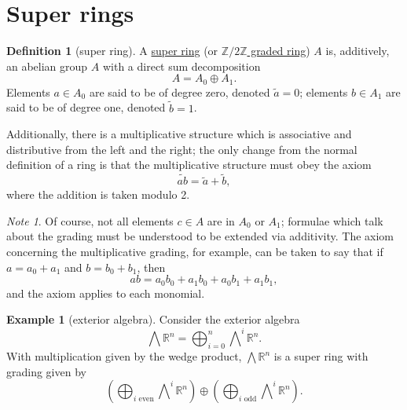 \documentclass[a4paper]{report}
\newcommand{\R}{\mathbb{R}}
\newcommand{\Z}{\mathbb{Z}}
\newcommand{\defn}[1]{\ul{#1}}
\theoremstyle{definition}
\newtheorem{definition}{Definition}[section]
\newtheorem{example}{Example}[section]
\theoremstyle{plain}
\theoremstyle{remark}
\newtheorem{note}{Note}[section]
\begin{document}
\section{Super rings}
\begin{definition}[super ring]
  \label{def:superring}
  A \defn{super ring} (or \defn{$\Z/2\Z$ graded ring}) $A$ is, additively, an abelian group $A$ with a direct sum decomposition
  \begin{equation*}
    A = A_{0} \oplus A_{1}.
  \end{equation*}
  Elements $a\in A_{0}$ are said to be of degree zero, denoted $\tilde{a} = 0$; elements $b\in A_{1}$ are said to be of degree one, denoted $\tilde{b} = 1$.

  Additionally, there is a multiplicative structure which is associative and distributive from the left and the right; the only change from the normal definition of a ring is that the multiplicative structure must obey the axiom
  \begin{equation*}
    \widetilde{ab} = \tilde{a} + \tilde{b},
  \end{equation*}
  where the addition is taken modulo 2.
\end{definition}

\begin{note}
  Of course, not all elements $c \in A$ are in $A_{0}$ or $A_{1}$; formulae which talk about the grading must be understood to be extended via additivity. The axiom concerning the multiplicative grading, for example, can be taken to say that if $a = a_{0} + a_{1}$ and $b = b_{0} + b_{1}$, then
  \begin{equation*}
    ab = a_{0} b_{0} + a_{1} b_{0} + a_{0} b_{1} + a_{1} b_{1},
  \end{equation*}
  and the axiom applies to each monomial.
\end{note}

\begin{example}[exterior algebra]
  \label{eg:exterioralgebra}
  Consider the exterior algebra
  \begin{equation*}
    \bigwedge \R^{n} = \bigoplus_{i=0}^{n} \bigwedge\nolimits^{i} \R^{n}.
  \end{equation*}
  With multiplication given by the wedge product, $\bigwedge \R^{n}$ is a super ring with grading given by
  \begin{equation*}
    \left( \bigoplus_{i\text{ even}} \bigwedge\nolimits^{i}\R^{n} \right) \oplus \left( \bigoplus_{i\text{ odd}}\bigwedge\nolimits^{i}\R^{n} \right).
  \end{equation*}
\end{example}
\end{document}
